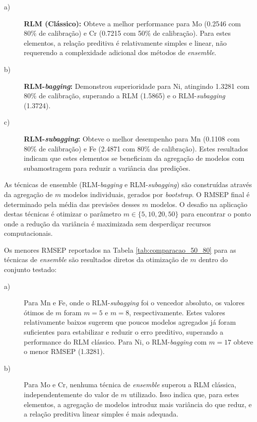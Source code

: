 \begin{description}
    \item[a)] \textbf{RLM (Clássico):} Obteve a melhor performance para Mo (\num{0,2546} com 80\% de calibração) e Cr (\num{0,7215} com 50\% de calibração). Para estes elementos, a relação preditiva é relativamente simples e linear, não requerendo a complexidade adicional dos métodos de \textit{ensemble}.
    \item[b)] \textbf{RLM-\textit{bagging}:} Demonstrou superioridade para Ni, atingindo \num{1,3281} com 80\% de calibração, superando a RLM (\num{1,5865}) e o RLM-\textit{subagging} (\num{1,3724}).
    \item[c)] \textbf{RLM-\textit{subagging}:} Obteve o melhor desempenho para Mn (\num{0,1108} com 80\% de calibração) e Fe (\num{2,4871} com 80\% de calibração). Estes resultados indicam que estes elementos se beneficiam da agregação de modelos com subamostragem para reduzir a variância das predições.
\end{description}

As técnicas de ensemble (RLM-\textit{bagging} e RLM-\textit{subagging}) são construídas através da agregação de $m$ modelos individuais, gerados por \textit{bootstrap}. O RMSEP final é determinado pela média das previsões desses $m$ modelos.
O desafio na aplicação destas técnicas é otimizar o parâmetro $m \in \{5, 10, 20, 50\}$ para encontrar o ponto onde a redução da variância é maximizada sem desperdiçar recursos computacionais.

Os menores RMSEP reportados na Tabela \ref{tab:comparacao_50_80} para as técnicas de \textit{ensemble} são resultados diretos da otimização de $m$ dentro do conjunto testado:

\begin{description}
\item[a)] Para Mn e Fe, onde o RLM-\textit{subagging} foi o vencedor absoluto, os valores ótimos de $m$ foram $m=5$ e $m=8$, respectivamente. Estes valores relativamente baixos sugerem que poucos modelos agregados já foram suficientes para estabilizar e reduzir o erro preditivo, superando a performance do RLM clássico. Para Ni, o RLM-\textit{bagging} com $m=17$ obteve o menor RMSEP (\num{1,3281}).
\item[b)] Para Mo e Cr, nenhuma técnica de \textit{ensemble} superou a RLM clássica, independentemente do valor de $m$ utilizado. Isso indica que, para estes elementos, a agregação de modelos introduz mais variância do que reduz, e a relação preditiva linear simples é mais adequada.
\end{description}

